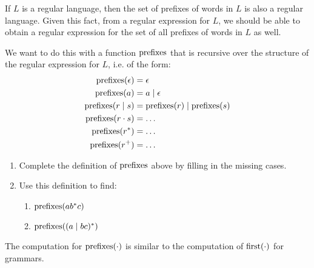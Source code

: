 
\begin{exercise}{}

  If \(L\) is a regular language, then the set of prefixes of words in \(L\) is
  also a regular language. Given this fact, from a regular expression for \(L\),
  we should be able to obtain a regular expression for the set of all prefixes
  of words in \(L\) as well.
  
  We want to do this with a function \(\operatorname{prefixes}\) that is recursive over the
  structure of the regular expression for \(L\), i.e. of the form:
  \begin{align*}
    \operatorname{prefixes}(\epsilon) &= \epsilon \\
    \operatorname{prefixes}(a) &= a \mid \epsilon \\
    \operatorname{prefixes}(r \mid s) &= \operatorname{prefixes}(r) \mid \operatorname{prefixes}(s) \\
    \operatorname{prefixes}(r \cdot s) &= \ldots \\
    \operatorname{prefixes}(r^*) &= \ldots \\
    \operatorname{prefixes}(r^+) &= \ldots
  \end{align*}

  \begin{enumerate}
    \item Complete the definition of \(\operatorname{prefixes}\) above by filling in the
    missing cases.
    \item Use this definition to find:
    \begin{enumerate}
      \item \(\operatorname{prefixes}(ab^*c)\)
      \item \(\operatorname{prefixes}((a \mid bc)^*)\)
    \end{enumerate}
  \end{enumerate}

  \begin{solution}
    The computation for \(\operatorname{prefixes}(\cdot)\) is similar to the computation of
    \(\operatorname{first}(\cdot)\) for grammars.


\end{solution}
\end{exercise}
